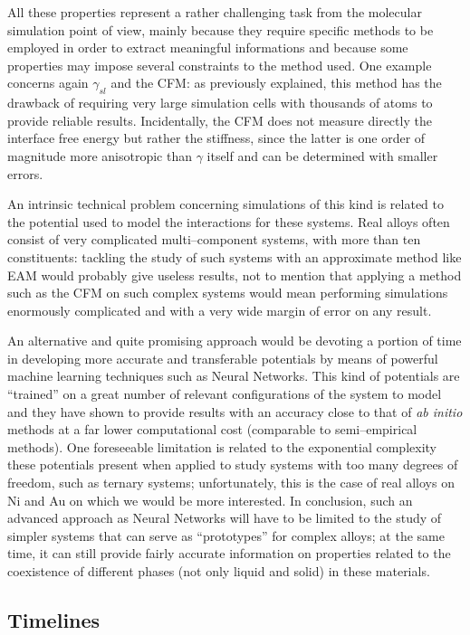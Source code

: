 All these properties represent a rather challenging task from the molecular simulation point of view, mainly because they require specific methods to be employed in order to extract meaningful informations and because some properties may impose several constraints to the method used. One example concerns again $\gamma_{sl}$ and the CFM: as previously explained, this method has the drawback of requiring very large simulation cells with thousands of atoms to provide reliable results. Incidentally, the CFM does not measure directly the interface free energy but rather the stiffness, since the latter is one order of magnitude more anisotropic than $\gamma$ itself and can be determined with smaller errors.

An intrinsic technical problem concerning simulations of this kind is related to the potential used to model the interactions for these systems. Real alloys often consist of very complicated multi--component systems, with more than ten constituents: tackling the study of such systems with an approximate method like EAM would probably give useless results, not to mention that applying a method such as the CFM on such complex systems would mean performing simulations enormously complicated and with a very wide margin of error on any result.

An alternative and quite promising approach would be devoting a portion of time in developing more accurate and transferable potentials by means of powerful machine learning techniques such as Neural Networks. This kind of potentials are ``trained'' on a great number of relevant configurations of the system to model and they have shown to provide results with an accuracy close to that of \textit{ab initio} methods at a far lower computational cost (comparable to semi--empirical methods). One foreseeable limitation is related to the exponential complexity these potentials present when applied to study systems with too many degrees of freedom, such as ternary systems; unfortunately, this is the case of real alloys on Ni and Au on which we would be more interested. In conclusion, such an advanced approach as Neural Networks will have to be limited to the study of simpler systems that can serve as ``prototypes'' for complex alloys; at the same time, it can still provide fairly accurate information on properties related to the coexistence of different phases (not only liquid and solid) in these materials.




\subsection{Timelines}